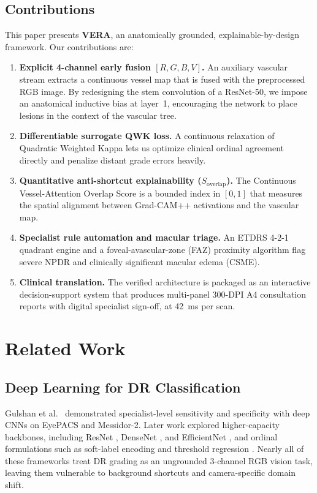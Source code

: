 \documentclass[conference]{IEEEtran}
\newcommand{\gcpp}{Grad-CAM++}
\newcommand{\sov}{S_{\mathrm{overlap}}}
\begin{document}
\subsection{Contributions}
This paper presents \textbf{VERA}, an anatomically grounded, explainable-by-design framework. Our contributions are:
\begin{enumerate}
\item \textbf{Explicit 4-channel early fusion $[R,G,B,V]$.} An auxiliary vascular stream extracts a continuous vessel map that is fused with the preprocessed RGB image. By redesigning the stem convolution of a ResNet-50, we impose an anatomical inductive bias at layer~1, encouraging the network to place lesions in the context of the vascular tree.
\item \textbf{Differentiable surrogate QWK loss.} A continuous relaxation of Quadratic Weighted Kappa lets us optimize clinical ordinal agreement directly and penalize distant grade errors heavily.
\item \textbf{Quantitative anti-shortcut explainability ($\sov$).} The Continuous Vessel-Attention Overlap Score is a bounded index in $[0,1]$ that measures the spatial alignment between \gcpp{} activations and the vascular map.
\item \textbf{Specialist rule automation and macular triage.} An ETDRS 4-2-1 quadrant engine and a foveal-avascular-zone (FAZ) proximity algorithm flag severe NPDR and clinically significant macular edema (CSME).
\item \textbf{Clinical translation.} The verified architecture is packaged as an interactive decision-support system that produces multi-panel 300-DPI A4 consultation reports with digital specialist sign-off, at 42~ms per scan.
\end{enumerate}

\section{Related Work}

\subsection{Deep Learning for DR Classification}
Gulshan et al.\ \cite{gulshan2016} demonstrated specialist-level sensitivity and specificity with deep CNNs on EyePACS and Messidor-2. Later work explored higher-capacity backbones, including ResNet \cite{he2016}, DenseNet \cite{huang2017}, and EfficientNet \cite{tan2019}, and ordinal formulations such as soft-label encoding and threshold regression \cite{gao2020}. Nearly all of these frameworks treat DR grading as an ungrounded 3-channel RGB vision task, leaving them vulnerable to background shortcuts and camera-specific domain shift.
\end{document}

